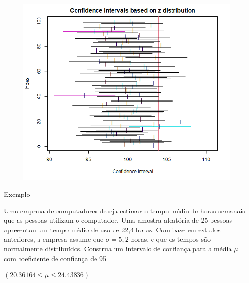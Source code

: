 \documentclass[14pt,aspectratio=1610]{beamer}
\begin{document}
\begin{frame}{}
    \begin{block}{}
    \justifying
   \begin{figure}
       \centering
       \includegraphics[scale=0.6]{figs/IC3.png}
   \end{figure}
    \end{block}
\end{frame}

\begin{frame}{Exemplo}
    \begin{block}{}
    \justifying
Uma empresa de computadores deseja estimar o tempo médio de horas semanais que as pessoas utilizam o computador. Uma amostra aleatória de 25 pessoas apresentou um tempo médio de uso de 22,4 horas. Com base em estudos anteriores, a empresa assume que $\sigma = 5,2$ horas, e que os tempos são normalmente distribuídos. Construa um intervalo de confiança para a média $\mu$ com coeficiente de confiança de 95%
    \end{block}
 \pause 
\begin{block}{}
$(20.36164\leq \mu\leq24.43836)$
\end{block}
\end{frame}
\end{document}
